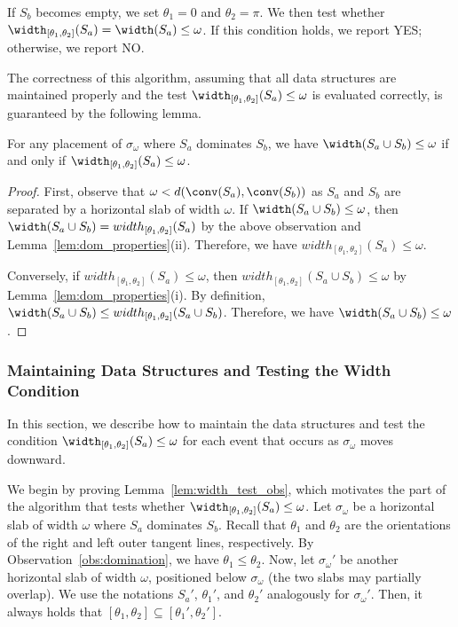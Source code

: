 If $S_b$ becomes empty, we set $\theta_1 = 0$ and $\theta_2 = \pi$. 
We then test whether $\width_{[\theta_1, \theta_2]}(S_a) = \width(S_a) \le \omega$. 
If this condition holds, we report YES; otherwise, we report NO.


The correctness of this algorithm, assuming that all data structures are maintained properly and the test $\width_{[\theta_1, \theta_2]}(S_a) \le \omega$ is evaluated correctly, is guaranteed by the following lemma.


\begin{lemma}
    \label{lem:decision_correctness}
    For any placement of $\sigma_\omega$ where $S_a$ dominates $S_b$, we have $\width(S_a \cup S_b) \le \omega$ if and only if $\width_{[\theta_1, \theta_2]}(S_a) \le \omega$. 
\end{lemma}

\begin{proof}
    First, observe that $\omega < d(\conv(S_a), \conv(S_b)) $ 
    as $S_a$ and $S_b$ are separated by a horizontal slab of width $\omega$.
    If $\width(S_a \cup S_b) \le \omega$, then $\width(S_a\cup S_b) =width_{[\theta_1, \theta_2]}(S_a)$ by the above observation and Lemma~\ref{lem:dom_properties}(ii).
    Therefore, we have $width_{[\theta_1, \theta_2]}(S_a) \le \omega$. 

    Conversely, if $width_{[\theta_1, \theta_2]}(S_a) \le \omega$, then $width_{[\theta_1, \theta_2]}(S_a \cup S_b) \le \omega$ by Lemma~\ref{lem:dom_properties}(i).
    By definition, $\width(S_a \cup S_b) \le width_{[\theta_1, \theta_2]}(S_a \cup S_b)$.
    Therefore, we have $\width(S_a \cup S_b) \le \omega$.
\end{proof}




\subsubsection{Maintaining Data Structures and Testing the Width Condition}
\label{sec:ds_maintain}


In this section, we describe how to maintain the data structures and test the condition $\width_{[\theta_1, \theta_2]}(S_a) \le \omega$ for each event that occurs as $\sigma_\omega$ moves downward.

We begin by proving Lemma~\ref{lem:width_test_obs}, which motivates the part of the algorithm that tests whether $\width_{[\theta_1, \theta_2]}(S_a) \le \omega$.
Let $\sigma_\omega$ be a horizontal slab of width $\omega$ where $S_a$ dominates $S_b$.
Recall that $\theta_1$ and $\theta_2$ are the orientations of the right and left outer tangent lines, respectively.
By Observation~\ref{obs:domination}, we have $\theta_1 \le \theta_2$.
Now, let $\sigma_\omega'$ be another horizontal slab of width $\omega$, positioned below $\sigma_\omega$ (the two slabs may partially overlap).
We use the notations $S_a'$, $\theta_1'$, and $\theta_2'$ analogously for $\sigma_{\omega}'$.
Then, it always holds that $[\theta_1, \theta_2] \subseteq[\theta_1', \theta_2']$.


